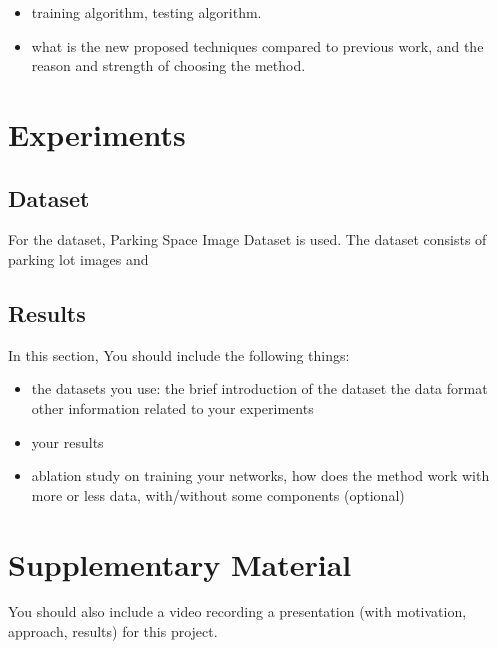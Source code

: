 \documentclass{article}
\begin{document}
\begin{itemize}
    \item training algorithm, testing algorithm.
    \item what is the new proposed techniques compared to previous work, and the reason and strength of choosing the method.
\end{itemize}

\section{Experiments}

\subsection{Dataset}
For the dataset, Parking Space Image Dataset is used. The dataset consists of parking lot images and  

\subsection{Results}

In this section, You should include the following things:

\begin{itemize}
    \item the datasets you use:
        \subitem the brief introduction of the dataset
        \subitem the data format
        \subitem other information related to your experiments
    \item your results
    \item ablation study on training your networks, how does the method work with more or less data, with/without some components (optional)
\end{itemize}


\section{Supplementary Material}

You should also include a video recording a presentation (with motivation, approach, results) for this project. 



\end{document}
